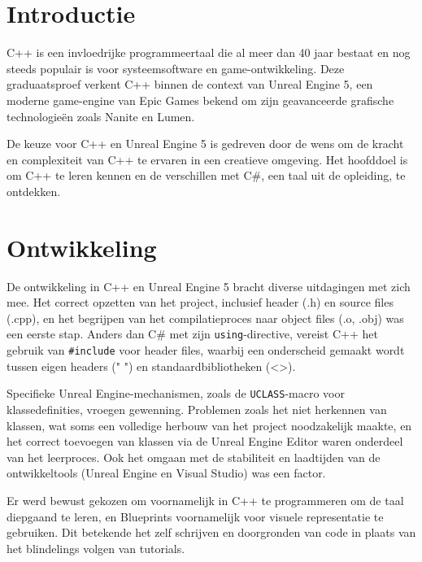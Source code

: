 \documentclass[a0,portrait]{hogent-poster}
\begin{document}
\begin{multicols}{2} %

\section{Introductie}

C++ is een invloedrijke programmeertaal die al meer dan 40 jaar bestaat en nog steeds populair is voor systeemsoftware en game-ontwikkeling. Deze graduaatsproef verkent C++ binnen de context van Unreal Engine 5, een moderne game-engine van Epic Games bekend om zijn geavanceerde grafische technologieën zoals Nanite en Lumen.

De keuze voor C++ en Unreal Engine 5 is gedreven door de wens om de kracht en complexiteit van C++ te ervaren in een creatieve omgeving. Het hoofddoel is om C++ te leren kennen en de verschillen met C\#, een taal uit de opleiding, te ontdekken.

\section{Ontwikkeling}

De ontwikkeling in C++ en Unreal Engine 5 bracht diverse uitdagingen met zich mee. Het correct opzetten van het project, inclusief header (.h) en source files (.cpp), en het begrijpen van het compilatieproces naar object files (.o, .obj) was een eerste stap. Anders dan C\# met zijn \texttt{using}-directive, vereist C++ het gebruik van \texttt{\#include} voor header files, waarbij een onderscheid gemaakt wordt tussen eigen headers (" ") en standaardbibliotheken (<>).

Specifieke Unreal Engine-mechanismen, zoals de \texttt{UCLASS}-macro voor klassedefinities, vroegen gewenning. Problemen zoals het niet herkennen van klassen, wat soms een volledige herbouw van het project noodzakelijk maakte, en het correct toevoegen van klassen via de Unreal Engine Editor waren onderdeel van het leerproces. Ook het omgaan met de stabiliteit en laadtijden van de ontwikkeltools (Unreal Engine en Visual Studio) was een factor.

Er werd bewust gekozen om voornamelijk in C++ te programmeren om de taal diepgaand te leren, en Blueprints voornamelijk voor visuele representatie te gebruiken. Dit betekende het zelf schrijven en doorgronden van code in plaats van het blindelings volgen van tutorials.


\end{multicols}
\end{document}

